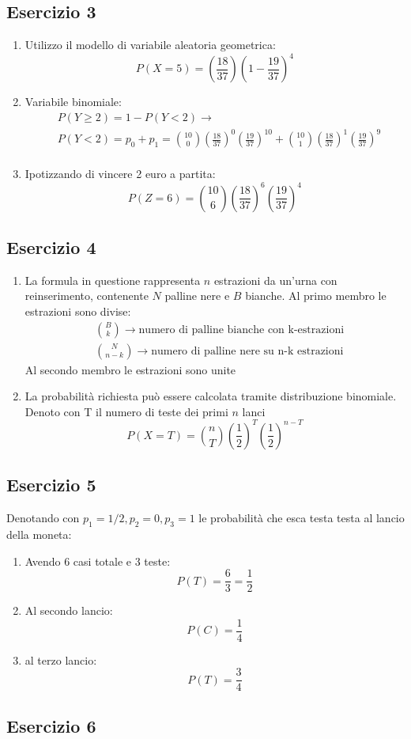 \documentclass[12pt]{article}
\begin{document}
\subsection*{Esercizio 3}
\begin{enumerate}
    \item Utilizzo il modello di variabile aleatoria geometrica:
    \[
        P(X=5) = \left(\frac{18}{37}\right)\left(1-\frac{19}{37}\right)^{4}
    \]
    \item Variabile binomiale:
    \begin{align*}
        &P(Y \ge 2) = 1 - P(Y < 2) \rightarrow \\
        &P(Y<2) = p_0+p_1 = \binom{10}{0}\left(\frac{18}{37}\right)^0\left(\frac{19}{37}\right)^{10} + \binom{10}{1}\left(\frac{18}{37}\right)^1\left(\frac{19}{37}\right)^9\\
    \end{align*}
    \item Ipotizzando di vincere 2 euro a partita:
    \[
    P(Z = 6) = \binom{10}{6}\left(\frac{18}{37}\right)^6\left(\frac{19}{37}\right)^4    
    \]
\end{enumerate}

\subsection*{Esercizio 4}
\begin{enumerate}
    \item La formula in questione rappresenta \(n\) estrazioni da un'urna con reinserimento,
    contenente \(N\) palline nere e \(B\) bianche. Al primo membro le estrazioni sono divise:
    \begin{align*}
        &\binom{B}{k} \rightarrow \text{numero di palline bianche con k-estrazioni} \\
        &\binom{N}{n-k} \rightarrow \text{numero di palline nere su n-k estrazioni}
    \end{align*}
    Al secondo membro le estrazioni sono unite
    \item La probabilità richiesta può essere calcolata tramite distribuzione binomiale.
    Denoto con T il numero di teste dei primi \(n\) lanci
    \[
    P(X=T) = \binom{n}{T} \left( \frac{1}{2} \right)^T \left( \frac{1}{2} \right)^{n-T}  
    \]       
\end{enumerate}

\subsection*{Esercizio 5}
Denotando con \(p_1 = 1/2,p_2 = 0,p_3 = 1\) le probabilità che esca testa testa al lancio della moneta:
\begin{enumerate}
    \item Avendo 6 casi totale e 3 teste:
    \[
    P(T) = \frac{6}{3} = \frac{1}{2}    
    \]
    \item Al secondo lancio:
    \[
    P(C) = \frac{1}{4}    
    \]
    \item al terzo lancio:
    \[
    P(T) = \frac{3}{4}    
    \]
\end{enumerate}
\subsection*{Esercizio 6}
\end{document}
